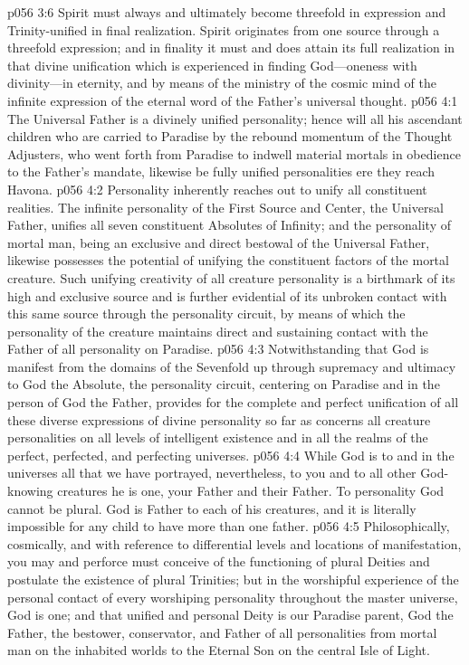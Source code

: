 \vs p056 3:6 Spirit must always and ultimately become threefold in expression and Trinity\hyp{}unified in final realization. Spirit originates from one source through a threefold expression; and in finality it must and does attain its full realization in that divine unification which is experienced in finding God---oneness with divinity---in eternity, and by means of the ministry of the cosmic mind of the infinite expression of the eternal word of the Father’s universal thought.\plusone
{}
\vs p056 4:1 The Universal Father is a divinely unified personality; hence will all his ascendant children who are carried to Paradise by the rebound momentum of the Thought Adjusters, who went forth from Paradise to indwell material mortals in obedience to the Father’s mandate, likewise be fully unified personalities ere they reach Havona.
\vs p056 4:2 Personality inherently reaches out to unify all constituent realities. The infinite personality of the First Source and Center, the Universal Father, unifies all seven constituent Absolutes of Infinity; and the personality of mortal man, being an exclusive and direct bestowal of the Universal Father, likewise possesses the potential of unifying the constituent factors of the mortal creature. Such unifying creativity of all creature personality is a birthmark of its high and exclusive source and is further evidential of its unbroken contact with this same source through the personality circuit, by means of which the personality of the creature maintains direct and sustaining contact with the Father of all personality on Paradise.
\vs p056 4:3 Notwithstanding that God is manifest from the domains of the Sevenfold up through supremacy and ultimacy to God the Absolute, the personality circuit, centering on Paradise and in the person of God the Father, provides for the complete and perfect unification of all these diverse expressions of divine personality so far as concerns all creature personalities on all levels of intelligent existence and in all the realms of the perfect, perfected, and perfecting universes.
\pc \vs p056 4:4 While God is to and in the universes all that we have portrayed, nevertheless, to you and to all other God\hyp{}knowing creatures he is one, your Father and their Father. To personality God cannot be plural. God is Father to each of his creatures, and it is literally impossible for any child to have more than one father.
\vs p056 4:5 Philosophically, cosmically, and with reference to differential levels and locations of manifestation, you may and perforce must conceive of the functioning of plural Deities and postulate the existence of plural Trinities; but in the worshipful experience of the personal contact of every worshiping personality throughout the master universe, God is one; and that unified and personal Deity is our Paradise parent, God the Father, the bestower, conservator, and Father of all personalities from mortal man on the inhabited worlds to the Eternal Son on the central Isle of Light.
